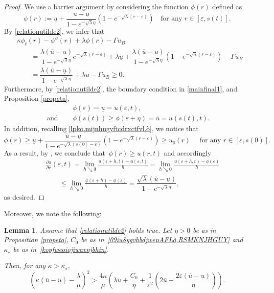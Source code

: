 \documentclass[12pt,a4paper,intlimits,sumlimits]{amsart}
\theoremstyle{definition}
\theoremstyle{plain}
\newtheorem{lemma}[definition]{Lemma}
\numberwithin{equation}{section}
\renewcommand{\le}{\leqslant}
\renewcommand{\ge}{\geqslant}
\begin{document}
\begin{proof} 
We use a barrier argument by considering the function $\phi(r)$ defined as
\[
\phi(r):=\underline u +\dfrac{\overline u-\underline u}{1-e^{-\sqrt\lambda \eta}}\left(1-e^{-\sqrt\lambda(r-\varepsilon)}\right) \quad \mbox{for any } r\in [\varepsilon, s(t)].
\]
By \eqref{relationutilde2},  we infer that
\[
\begin{split}
&\kappa\phi_t(r)-\phi''(r) +\lambda\phi(r)-\Gamma u_B\\&\qquad = \dfrac{\lambda(\overline u-\underline u)}{1-e^{-\sqrt\lambda \eta}} e^{-\sqrt\lambda (r-\varepsilon)}+\lambda\underline u +\dfrac{\lambda(\overline u-\underline u)}{1-e^{-\sqrt\lambda \eta}}\left(1-e^{-\sqrt\lambda(r-\varepsilon)}\right)-\Gamma u_B\\
&\qquad=\dfrac{\lambda(\overline u-\underline u)}{1-e^{-\sqrt\lambda \eta}} +\lambda\underline u-\Gamma u_B\ge 0.
\end{split}
\]
Furthermore, by \eqref{relationutilde2}, the boundary condition in \eqref{mainfinal1},  and Proposition \ref{propeta},
\[
\begin{split}
&\phi(\varepsilon) =\underline u= u(\varepsilon, t),\\[7pt]
\mbox{ and }\quad &\phi(s(t))\ge\phi(\varepsilon+\eta)=\overline u =u(s(t), t).
\end{split}
\]
In addition, recalling \eqref{lpko,mijnhugyftcdrxctfvl,ò}, we notice that
\[
\phi(r)\ge \underline u +\dfrac{\overline u-\underline u}{1-e^{-\sqrt\lambda (s(0)-\varepsilon)}}\left(1-e^{-\sqrt\lambda(r-\varepsilon)}\right)\ge u_0(r)\quad\mbox{ for any } r\in [\varepsilon, s(0)].
\]
As a result, by \cite[Corollary~2.5]{MR1465184},
we conclude that~$\phi(r)\ge u(r,t)$ and accordingly
\begin{eqnarray*}&&
\frac{\partial u}{\partial r}(\varepsilon,t)=\lim_{h\searrow0}\frac{u(\varepsilon+h,t)-u(\varepsilon,t)}{h}=\lim_{h\searrow0}\frac{u(\varepsilon+h,t)-\phi(\varepsilon)}{h}\\&&\qquad\le\lim_{h\searrow0}\frac{\phi(\varepsilon+h)-\phi(\varepsilon)}{h} 
= \dfrac{\sqrt\lambda(\overline u-\underline u)}{1-e^{-\sqrt\lambda \eta}},
\end{eqnarray*}
as desired.
\end{proof}

Moreover, we note the following:
\begin{lemma}\label{kmcaHVIBEWòonvcàwkoplèò}
Assume that \eqref{relationutilde2} holds true. Let $\eta>0$ be as in Proposition \ref{propeta}, $C_0$ be 
as in~\eqref{09iu8ygvhbdjwenAFLò,RSMKNJHGUY} and~$\kappa_\star$ be as in~\eqref{kopfweoiojiwavnjbhin}.

Then, for any $\kappa>\kappa_\star$,
\[
\left(\kappa(\overline{u}-\widetilde u)-\frac{\lambda}{\mu}\right)^2 >\frac{4\kappa}{\mu}\left(\lambda\widetilde u +\dfrac{C_0}{\eta}+\frac{1}{\varepsilon^2}\left(2\overline u +\dfrac{2\varepsilon(\overline u -\underline u)}{\eta} \right)\right).
\]
\end{lemma}
\end{document}
